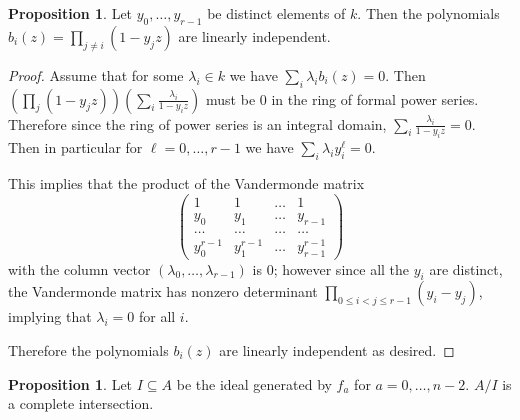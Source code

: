 \documentclass{amsart}
\numberwithin{equation}{section}
\theoremstyle{definition}
\newtheorem{proposition}[equation]{Proposition}
\begin{document}
\begin{proposition}\label{prop:vand}Let $y_0, \ldots, y_{r - 1}$ be distinct elements of $k$.  Then the polynomials $b_i(z) = \prod_{j \neq i} (1 - y_j z)$ are linearly independent.
\end{proposition}
\begin{proof} 
Assume that for some $\lambda_i \in k$ we have $\sum_i \lambda_ib_i(z)=0$.  Then $\left(\prod_j (1-y_jz)\right)\left(\sum_i \frac{\lambda_i}{1-y_iz}\right)$ must be $0$ in the ring of formal power series. Therefore since the ring of power series is an integral domain, $\sum_i \frac{\lambda_i}{1-y_iz}=0$. Then in particular for $\ell=0,\dots,r-1$ we have $\sum_i \lambda_iy_i^\ell=0$.

This implies that the product of the Vandermonde matrix 
\[
\left(\begin{matrix} 1& 1& \dots& 1\\y_0&y_1&\dots&y_{r-1}\\\dots&\dots&\dots&\dots\\y_0^{r-1}&y_1^{r-1}&\dots&y_{r-1}^{r-1}\end{matrix}\right)
\]
with the column vector $(\lambda_0,\dots,\lambda_{r-1})$ is $0$; however since all the $y_i$ are distinct, the Vandermonde matrix has nonzero determinant $\prod_{0 \le i < j \le r-1} (y_i-y_j)$, implying that $\lambda_i=0$ for all $i$. 

Therefore the polynomials $b_i(z)$ are linearly independent as desired.
\end{proof}

\begin{proposition}\label{prop:ci} Let $I \subseteq A$ be the ideal generated by $f_a$ for $a=0,\dots,n-2$. $A/I$ is a complete intersection. 
\end{proposition}
\end{document}
